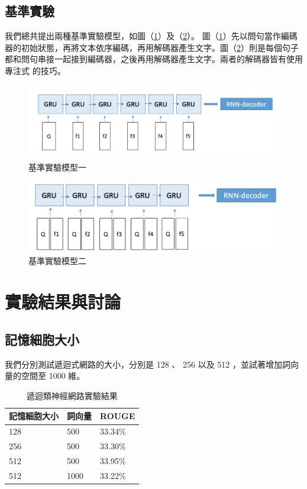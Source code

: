 \subsection{基準實驗}
我們總共提出兩種基準實驗模型，如圖（\ref{fig:baseline1}）及（\ref{fig:baseline2}）。
圖（\ref{fig:baseline1}）先以問句當作編碼器的初始狀態，再將文本依序編碼，再用解碼器產生文字。圖（\ref{fig:baseline2}）則是每個句子都和問句串接一起接到編碼器，之後再用解碼器產生文字。兩者的解碼器皆有使用專注式 \cite{bahdanau2014neural} 的技巧。
\begin{figure}[h]
    \centering
    \includegraphics[scale=0.54]{images/chap3_baseline1.png}
    \caption{基準實驗模型一}\label{fig:baseline1}
\end{figure}
\begin{figure}[h]
    \centering
    \includegraphics[scale=0.54]{images/chap3_baseline2.png}
    \caption{基準實驗模型二}\label{fig:baseline2}
\end{figure}

\section{實驗結果與討論}
\subsection{記憶細胞大小}
我們分別測試遞迴式網路的大小，分別是 128 、 256 以及 512 ，並試著增加詞向量的空間至 1000 維。
\begin{table}
    \caption{遞迴類神經網路實驗結果}
    \label{table:RNNCell_size}
    \centering
    \begin{tabular}{|l|l|l|}
        \hline
        記憶細胞大小&詞向量 & ROUGE\\
        \hline
        128 & 500 & 33.34\% \\ %
        \hline
        256 & 500 & 33.30\% \\
        \hline
        512 & 500 & 33.95\% \\
        \hline
        512 & 1000 & 33.22\% \\
        \hline
    \end{tabular}
\end{table}
